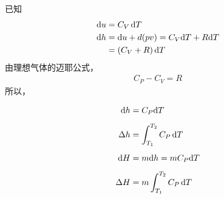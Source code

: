\theorem[理想气体焓的计算]
已知
\begin{align}
	{\rm{d}} u &= C_V \, {\rm{d}} T\\
	{\rm{d}} h &= {\rm{d}} u + d(pv) = C_V {\rm{d}} T + R {\rm{d}} T\notag\\
	& = \left(C_V + R\right) {\rm{d}} T
\end{align}
由理想气体的迈耶公式，
\begin{align}
	C_P - C_V = R
\end{align}
所以，
\begin{itemizea}
	\item \vspace*{-1em}\begin{align}
		{\rm{d}} h &= C_P {\rm{d}} T\\[0.5em]
		\Delta h &= \int_{T_1}^{T_2} C_P \, {\rm{d}} T\\[0.5em]
		{\rm{d}} H &= m {\rm{d}} h = m C_P {\rm{d}} T\\[0.5em]
		\Delta H &= m  \int_{T_1}^{T_2} C_P \, {\rm{d}} T
	\end{align}
\end{itemizea}
\vspace*{1em}
